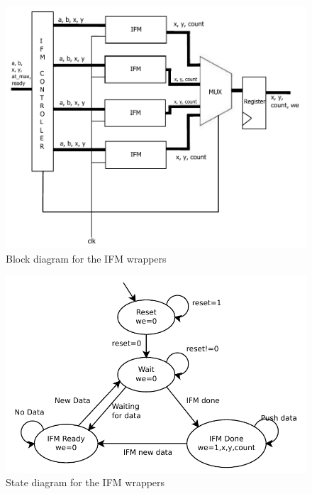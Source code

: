 \documentclass{article}
\begin{document}
\begin{figure}[h!]
  \centering
    \includegraphics[width=\textwidth]{block_diagrams/ifmunit.pdf}
  \caption{Block diagram for the IFM wrappers}
\end{figure}

\begin{figure}[h!]
  \centering
    \includegraphics[width=\textwidth]{state_diagrams/ifmunit.pdf}
  \caption{State diagram for the IFM wrappers}
\end{figure}
\end{document}
